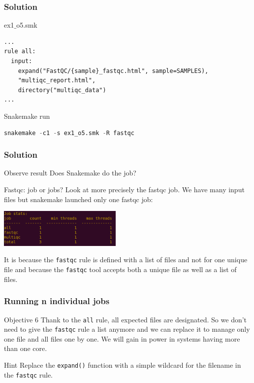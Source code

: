 \begin{frame}[containsverbatim]
\frametitle{Solution}
\begin{exampleblock}{ex1$\_$o5.smk}
\begin{lstlisting}
...
rule all:
  input:
    expand("FastQC/{sample}_fastqc.html", sample=SAMPLES),
    "multiqc_report.html",
    directory("multiqc_data")
...
\end{lstlisting}
\end{exampleblock}
\begin{exampleblock}{Snakemake run}
\begin{lstlisting}[language=python]
snakemake -c1 -s ex1_o5.smk -R fastqc
\end{lstlisting}
\end{exampleblock}
\end{frame}
\begin{frame}[containsverbatim]
\frametitle{Solution}
\begin{exampleblock}{Observe result}
Does Snakemake do the job?\\
\end{exampleblock}
\begin{exampleblock}{Fastqc: job or jobs?}
Look at more precisely the fastqc job. We have many input files but snakemake launched only one fastqc job:
\begin{center}
    \includegraphics[width=6cm]{03_workflow/images/FAIR_ex1_o5_smk.png}
\end{center}
It is because the \verb|fastqc| rule is defined with a list of files and not for one unique file and because the \verb|fastqc| tool accepts both a unique file as well as a list of files.
\end{exampleblock}
\end{frame}
\begin{frame}[containsverbatim]
\frametitle{Running n individual jobs}
\begin{exampleblock}{Objective 6}
Thank to the \verb|all| rule, all expected files are designated. So we don't need to give the \verb|fastqc| rule a list anymore and we can replace it to manage only one file and all files one by one. We will gain in power in systems having more than one core.
\end{exampleblock}
\begin{exampleblock}{Hint}
Replace the \verb|expand()| function with a simple wildcard for the filename in the \verb|fastqc| rule.
\end{exampleblock}
\end{frame}
